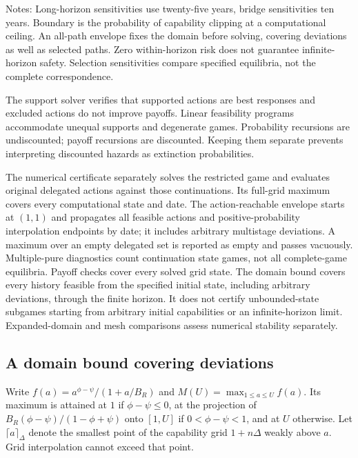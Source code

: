 \begin{table}[H]\centering\scriptsize
\caption{Sensitivity of the selected open-development equilibrium}\label{tab:sensitivity}
\resizebox{\textwidth}{!}{}
\begin{minipage}{\textwidth}\footnotesize\vspace{0.5em}
Notes: Long-horizon sensitivities use twenty-five years, bridge sensitivities ten years. Boundary is the probability of capability clipping at a computational ceiling. An all-path envelope fixes the domain before solving, covering deviations as well as selected paths. Zero within-horizon risk does not guarantee infinite-horizon safety. Selection sensitivities compare specified equilibria, not the complete correspondence.
\end{minipage}
\end{table}

The support solver verifies that supported actions are best responses and excluded actions do not improve payoffs. Linear feasibility programs accommodate unequal supports and degenerate games. Probability recursions are undiscounted; payoff recursions are discounted. Keeping them separate prevents interpreting discounted hazards as extinction probabilities.

The numerical certificate separately solves the restricted game and evaluates original delegated actions against those continuations. Its full-grid maximum covers every computational state and date. The action-reachable envelope starts at $(1,1)$ and propagates all feasible actions and positive-probability interpolation endpoints by date; it includes arbitrary multistage deviations. A maximum over an empty delegated set is reported as empty and passes vacuously. Multiple-pure diagnostics count continuation state games, not all complete-game equilibria. Payoff checks cover every solved grid state. The domain bound covers every history feasible from the specified initial state, including arbitrary deviations, through the finite horizon. It does not certify unbounded-state subgames starting from arbitrary initial capabilities or an infinite-horizon limit. Expanded-domain and mesh comparisons assess numerical stability separately.

\subsection{A domain bound covering deviations}\label{app:domain}
Write $f(a)=a^{\phi-\psi}/(1+a/B_R)$ and $M(U)=\max_{1\leq a\leq U}f(a)$. Its maximum is attained at $1$ if $\phi-\psi\leq0$, at the projection of $B_R(\phi-\psi)/(1-\phi+\psi)$ onto $[1,U]$ if $0<\phi-\psi<1$, and at $U$ otherwise. Let $\lceil a\rceil_\Delta$ denote the smallest point of the capability grid $1+n\Delta$ weakly above $a$. Grid interpolation cannot exceed that point.

